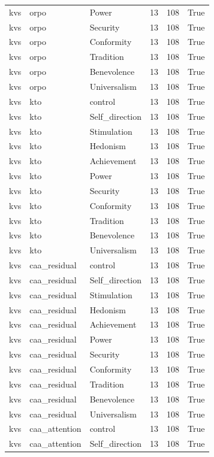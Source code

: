 \begin{tabular}{lllrrr}
kvs & orpo & Power & 13 & 108 & True \\
kvs & orpo & Security & 13 & 108 & True \\
kvs & orpo & Conformity & 13 & 108 & True \\
kvs & orpo & Tradition & 13 & 108 & True \\
kvs & orpo & Benevolence & 13 & 108 & True \\
kvs & orpo & Universalism & 13 & 108 & True \\
kvs & kto & control & 13 & 108 & True \\
kvs & kto & Self\_direction & 13 & 108 & True \\
kvs & kto & Stimulation & 13 & 108 & True \\
kvs & kto & Hedonism & 13 & 108 & True \\
kvs & kto & Achievement & 13 & 108 & True \\
kvs & kto & Power & 13 & 108 & True \\
kvs & kto & Security & 13 & 108 & True \\
kvs & kto & Conformity & 13 & 108 & True \\
kvs & kto & Tradition & 13 & 108 & True \\
kvs & kto & Benevolence & 13 & 108 & True \\
kvs & kto & Universalism & 13 & 108 & True \\
kvs & caa\_residual & control & 13 & 108 & True \\
kvs & caa\_residual & Self\_direction & 13 & 108 & True \\
kvs & caa\_residual & Stimulation & 13 & 108 & True \\
kvs & caa\_residual & Hedonism & 13 & 108 & True \\
kvs & caa\_residual & Achievement & 13 & 108 & True \\
kvs & caa\_residual & Power & 13 & 108 & True \\
kvs & caa\_residual & Security & 13 & 108 & True \\
kvs & caa\_residual & Conformity & 13 & 108 & True \\
kvs & caa\_residual & Tradition & 13 & 108 & True \\
kvs & caa\_residual & Benevolence & 13 & 108 & True \\
kvs & caa\_residual & Universalism & 13 & 108 & True \\
kvs & caa\_attention & control & 13 & 108 & True \\
kvs & caa\_attention & Self\_direction & 13 & 108 & True \\

\end{tabular}
